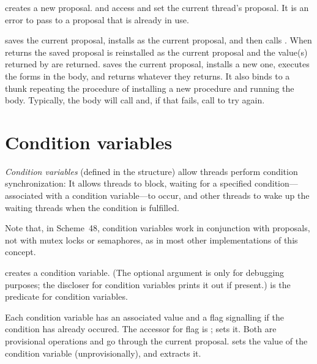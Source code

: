  creates a new proposal.
 and  access and set
 the current thread's proposal.
It is an error to pass to  a proposal that
 is already in use.

 saves the current proposal, installs  as
 the current proposal, and then calls .
When  returns the saved proposal is reinstalled as the current
proposal
and the value(s) returned by  are returned.
 saves the current proposal, installs a new
one, executes the forms in the body, and returns whatever they
returns.  It also binds  to a thunk repeating the
procedure of installing a new procedure and running the body.
Typically, the body will call  and, if that fails,
call  to try again.

\section{Condition variables}

\textit{Condition variables} (defined in the 
structure) allow threads perform condition synchronization: It allows
threads to block, waiting for a specified condition---associated with a
condition variable---to occur, and other threads to wake up the waiting
threads when the condition is fulfilled.

Note that, in Scheme~48, condition variables work in conjunction with
proposals, not with mutex locks or semaphores, as in most other
implementations of this concept.

\begin{protos}
\end{protos}
%
 creates a condition variable.  (The optional
 argument is only for debugging purposes; the discloser for
condition variables prints it out if present.)   is the
predicate for condition variables.

Each condition variable has an associated value and a flag
 signalling if the condition has already occured.
The accessor for flag is ;
 sets it.  Both are provisional
operations and go through the current proposal.
 sets the value of the condition variable
(unprovisionally), and  extracts it.

